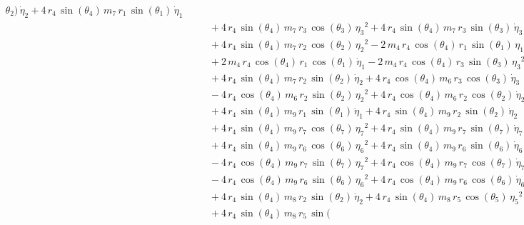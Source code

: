 \begin{eqnarray*}
{\theta_{2}})\,{\dot{\eta}_{2}} + 4\,r_{4}\,\sin({\theta_{4}})\,m_{7}
\,r_{1}\,\sin({\theta_{1}})\,{\dot{\eta}_{1}} \\ &&\quad\mbox{} + 4\,r
_{4}\,\sin({\theta_{4}})\,m_{7}\,r_{3}\,\cos({\theta_{3}})\,{{\eta_{3}
}}^2 + 4\,r_{4}\,\sin({\theta_{4}})\,m_{7}\,r_{3}\,\sin({\theta_{3}})
\,{\dot{\eta}_{3}} \\ &&\quad\mbox{} + 4\,r_{4}\,\sin({\theta_{4}})\,m
_{7}\,r_{2}\,\cos({\theta_{2}})\,{{\eta_{2}}}^2 - 2\,m_{4}\,r_{4}\,
\cos({\theta_{4}})\,r_{1}\,\sin({\theta_{1}})\,{{\eta_{1}}}^2
 \\ &&\quad\mbox{} + 2\,m_{4}\,r_{4}\,\cos({\theta_{4}})\,r_{1}\,\cos(
{\theta_{1}})\,{\dot{\eta}_{1}} - 2\,m_{4}\,r_{4}\,\cos({\theta_{4}})
\,r_{3}\,\sin({\theta_{3}})\,{{\eta_{3}}}^2 \\ &&\quad\mbox{} + 4\,r_{
4}\,\sin({\theta_{4}})\,m_{7}\,r_{2}\,\sin({\theta_{2}})\,{\dot{\eta}
_{2}} + 4\,r_{4}\,\cos({\theta_{4}})\,m_{6}\,r_{3}\,\cos({\theta_{3}})
\,{\dot{\eta}_{3}} \\ &&\quad\mbox{} - 4\,r_{4}\,\cos({\theta_{4}})\,m
_{6}\,r_{2}\,\sin({\theta_{2}})\,{{\eta_{2}}}^2 + 4\,r_{4}\,\cos({
\theta_{4}})\,m_{6}\,r_{2}\,\cos({\theta_{2}})\,{\dot{\eta}_{2}}
 \\ &&\quad\mbox{} + 4\,r_{4}\,\sin({\theta_{4}})\,m_{9}\,r_{1}\,\sin(
{\theta_{1}})\,{\dot{\eta}_{1}} + 4\,r_{4}\,\sin({\theta_{4}})\,m_{9}
\,r_{2}\,\sin({\theta_{2}})\,{\dot{\eta}_{2}} \\ &&\quad\mbox{} + 4\,r
_{4}\,\sin({\theta_{4}})\,m_{9}\,r_{7}\,\cos({\theta_{7}})\,{{\eta_{7}
}}^2 + 4\,r_{4}\,\sin({\theta_{4}})\,m_{9}\,r_{7}\,\sin({\theta_{7}})
\,{\dot{\eta}_{7}} \\ &&\quad\mbox{} + 4\,r_{4}\,\sin({\theta_{4}})\,m
_{9}\,r_{6}\,\cos({\theta_{6}})\,{{\eta_{6}}}^2 + 4\,r_{4}\,\sin({
\theta_{4}})\,m_{9}\,r_{6}\,\sin({\theta_{6}})\,{\dot{\eta}_{6}}
 \\ &&\quad\mbox{} - 4\,r_{4}\,\cos({\theta_{4}})\,m_{9}\,r_{7}\,\sin(
{\theta_{7}})\,{{\eta_{7}}}^2 + 4\,r_{4}\,\cos({\theta_{4}})\,m_{9}\,r
_{7}\,\cos({\theta_{7}})\,{\dot{\eta}_{7}} \\ &&\quad\mbox{} - 4\,r_{4
}\,\cos({\theta_{4}})\,m_{9}\,r_{6}\,\sin({\theta_{6}})\,{{\eta_{6}}}^
2 + 4\,r_{4}\,\cos({\theta_{4}})\,m_{9}\,r_{6}\,\cos({\theta_{6}})\,{
\dot{\eta}_{6}} \\ &&\quad\mbox{} + 4\,r_{4}\,\sin({\theta_{4}})\,m_{8
}\,r_{2}\,\sin({\theta_{2}})\,{\dot{\eta}_{2}} + 4\,r_{4}\,\sin({
\theta_{4}})\,m_{8}\,r_{5}\,\cos({\theta_{5}})\,{{\eta_{5}}}^2
 \\ &&\quad\mbox{} + 4\,r_{4}\,\sin({\theta_{4}})\,m_{8}\,r_{5}\,\sin(

\end{eqnarray*}

